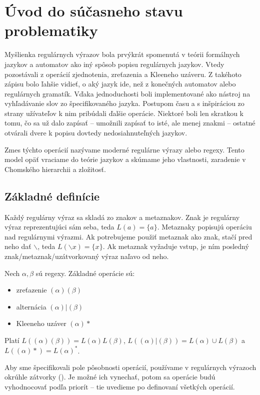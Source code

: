 \chapter[Súčasný stav problematiky]{Úvod do súčasneho stavu problematiky}
\label{chap:uvod}

Myšlienka regulárnych výrazov bola prvýkrát spomenutá v teórii formálnych jazykov a automatov ako iný spôsob popisu regulárnych jazykov. Vtedy pozostávali z operácií zjednotenia, zreťazenia a Kleeneho uzáveru. Z takéhoto zápisu bolo ľahšie vidieť, o aký jazyk ide, než z konečných automatov alebo regulárnych gramatík. Vďaka jednoduchosti boli implementované ako nástroj na vyhľadávanie slov zo špecifikovaného jazyka. Postupom času a s inšpiráciou zo strany užívateľov k nim pribúdali ďalšie operácie. Niektoré boli len skratkou k tomu, čo sa už dalo zapísať -- umožnili zapísať to isté, ale menej znakmi -- ostatné otvárali dvere k popisu dovtedy nedosiahnuteľných jazykov.

Zmes týchto operácií nazývame moderné regulárne výrazy alebo regexy. Tento model opäť vraciame do teórie jazykov a skúmame jeho vlastnosti, zaradenie v Chomského hierarchii a zložitosť.

\section{Základné definície}
\label{definicie}

Každý regulárny výraz sa skladá zo znakov a metaznakov. Znak je regulárny výraz reprezentujúci sám seba, teda $L(a) = \lbrace a \rbrace$. Metaznaky popisujú operáciu nad regulárnymi výrazmi. Ak potrebujeme použiť metaznak ako znak, stačí pred neho dať $\backslash$, teda $L(\backslash x) = \lbrace x \rbrace$. Ak metaznak vyžaduje vstup, je ním posledný znak/metaznak/uzátvorkovaný výraz naľavo od neho.

Nech $\alpha,\beta$ sú regexy. Základné operácie sú:
\begin{itemize}
\item zreťazenie $(\alpha)(\beta)$
\item alternácia $(\alpha)|(\beta)$
\item Kleeneho uzáver $(\alpha)*$
\end{itemize}
Platí $L((\alpha)(\beta)) = L(\alpha)L(\beta)$, $L((\alpha)|(\beta)) = L(\alpha)\cup L(\beta)$ a $L((\alpha)*) = L(\alpha)^*$.

Aby sme špecifikovali pole pôsobnosti operácií, používame v regulárnych výrazoch okrúhle zátvorky (). Je možné ich vynechať, potom sa operácie budú vyhodnocovať podľa priorít -- tie uvedieme po definovaní všetkých operácií.

